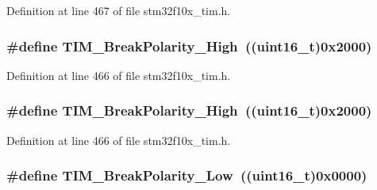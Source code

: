 Definition at line 467 of file stm32f10x\+\_\+tim.\+h.

\subsubsection[{\texorpdfstring{T\+I\+M\+\_\+\+Break\+Polarity\+\_\+\+High}{TIM_BreakPolarity_High}}]{\setlength{\rightskip}{0pt plus 5cm}\#define T\+I\+M\+\_\+\+Break\+Polarity\+\_\+\+High~(({\bf uint16\+\_\+t})0x2000)}\hypertarget{group___break___polarity_gabd4b72079548fd8903413a348539542b}{}\label{group___break___polarity_gabd4b72079548fd8903413a348539542b}


Definition at line 466 of file stm32f10x\+\_\+tim.\+h.

\subsubsection[{\texorpdfstring{T\+I\+M\+\_\+\+Break\+Polarity\+\_\+\+High}{TIM_BreakPolarity_High}}]{\setlength{\rightskip}{0pt plus 5cm}\#define T\+I\+M\+\_\+\+Break\+Polarity\+\_\+\+High~(({\bf uint16\+\_\+t})0x2000)}\hypertarget{group___break___polarity_gabd4b72079548fd8903413a348539542b}{}\label{group___break___polarity_gabd4b72079548fd8903413a348539542b}


Definition at line 466 of file stm32f10x\+\_\+tim.\+h.

\subsubsection[{\texorpdfstring{T\+I\+M\+\_\+\+Break\+Polarity\+\_\+\+Low}{TIM_BreakPolarity_Low}}]{\setlength{\rightskip}{0pt plus 5cm}\#define T\+I\+M\+\_\+\+Break\+Polarity\+\_\+\+Low~(({\bf uint16\+\_\+t})0x0000)}\hypertarget{group___break___polarity_ga565656ca81d17f9a1807afe3971dff6e}{}\label{group___break___polarity_ga565656ca81d17f9a1807afe3971dff6e}



